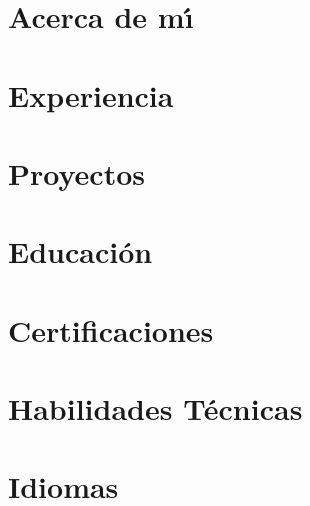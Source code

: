 \documentclass{minimal}
\begin{document}
\makecvheader

\section{Acerca de m\'{\i}}
\cvabout

\section{Experiencia}
\cvexperience

\section{Proyectos}
\cvprojects

\section{Educaci\'on}
\cveducation

\section{Certificaciones}
\cvcertifications

\section{Habilidades T\'ecnicas}
\cvskills

\section{Idiomas}
\cvlanguages
\end{document}
